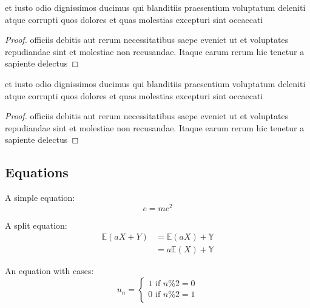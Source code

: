 \begin{lemma}
    et iusto odio dignissimos ducimus qui blanditiis praesentium voluptatum deleniti atque corrupti quos dolores et quas molestias excepturi sint occaecati 
\end{lemma}
\begin{proof}
    officiis debitis aut rerum necessitatibus saepe eveniet ut et voluptates repudiandae sint et molestiae non recusandae. 
Itaque earum rerum hic tenetur a sapiente delectus
\end{proof}

\begin{proposition}
    et iusto odio dignissimos ducimus qui blanditiis praesentium voluptatum deleniti atque corrupti quos dolores et quas molestias excepturi sint occaecati 
\end{proposition}
\begin{proof}
    officiis debitis aut rerum necessitatibus saepe eveniet ut et voluptates repudiandae sint et molestiae non recusandae. 
Itaque earum rerum hic tenetur a sapiente delectus
\end{proof}

\subsection{Equations}

A simple equation:
\begin{equation}
    e = mc^2
\end{equation}

A split equation:
\begin{equation}
    \begin{split}
        \mathbb{E}(aX + Y) &= \mathbb{E}(aX) + \mathbb{Y}\\
                           &= a\mathbb{E}(X) + \mathbb{Y}
    \end{split}
\end{equation}

An equation with cases:
\begin{equation}
    u_n =
    \begin{cases}
        1 \text{ if } n\%2=0 \\
        0 \text{ if } n\%2=1 \\
    \end{cases}
\end{equation}
